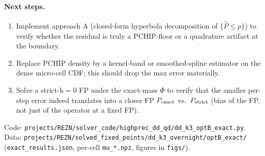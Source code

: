 \documentclass[10pt]{article}
\begin{document}
\paragraph{Next steps.}
\begin{enumerate}
  \item Implement approach A (closed-form hyperbola decomposition of
        $\{\widehat P\le p\}$) to verify whether the residual is truly
        a PCHIP-floor or a quadrature artifact at the boundary.
  \item Replace PCHIP density by a kernel-band or smoothed-spline
        estimator on the dense micro-cell CDF; this should drop the
        max error materially.
  \item Solve a strict-h$=0$ FP under the exact-mass $\Phi$ to verify
        that the smaller per-step error indeed translates into a closer
        FP $P_{\rm exact}$ vs.\ $P_{\rm strict}$ (bias of the FP, not
        just of the operator at a fixed FP).
\end{enumerate}

\bigskip\noindent\small
Code: \verb|projects/REZN/solver_code/highprec_dd_qd/dd_k3_optB_exact.py|.
Data: \verb|projects/REZN/solved_fixed_points/dd_k3_overnight/optB_exact/|
(\verb|exact_results.json|, per-cell \verb|mu_*.npz|, figures in
\verb|figs/|).
\end{document}

